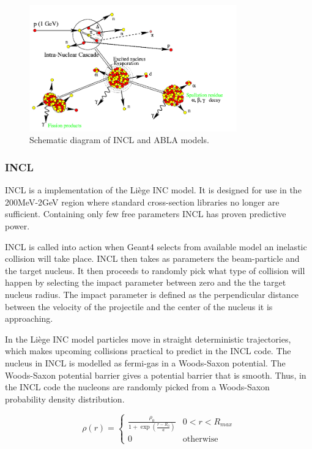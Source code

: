 \begin{figure} 
\begin{center}
\includegraphics[width=0.8\textwidth]{images/inclScematic.png}  
\caption{\label{fig:inclschematic} Schematic diagram of INCL and ABLA models.}
 
 \end{center}
 \end{figure}


\subsubsection{INCL}

INCL is a implementation of the Liège INC model. It is designed for use in the 200MeV-2GeV region where standard cross-section libraries no longer are sufficient. Containing only few free parameters INCL has proven predictive power.

INCL is called into action when Geant4 selects from available model an inelastic collision will take place. INCL then takes as parameters the beam-particle and the target nucleus. It then proceeds to randomly pick what type of collision will happen by selecting the impact parameter between zero and the the target nucleus radius. The impact parameter is defined as the perpendicular distance between the velocity of the projectile and the center of the nucleus it is approaching.

In the Liège INC model particles move in straight deterministic trajectories, which makes upcoming collisions practical to predict in the INCL code.
 The nucleus in INCL is modelled as fermi-gas in a Woods-Saxon potential. %
 The Woods-Saxon potential barrier gives a potential barrier that is smooth. Thus, in the INCL code the nucleons are randomly picked from a Woods-Saxon probability density distribution.

\begin{equation}
\rho(r) = \begin{cases}
\frac{\rho_{0}}{1+\exp({\frac{r-R_{0}}{a}})} & 0 < r < R_{max} \\
0 & \text{otherwise}
\end{cases}
\label{WoodsSaxon}
\end{equation}

